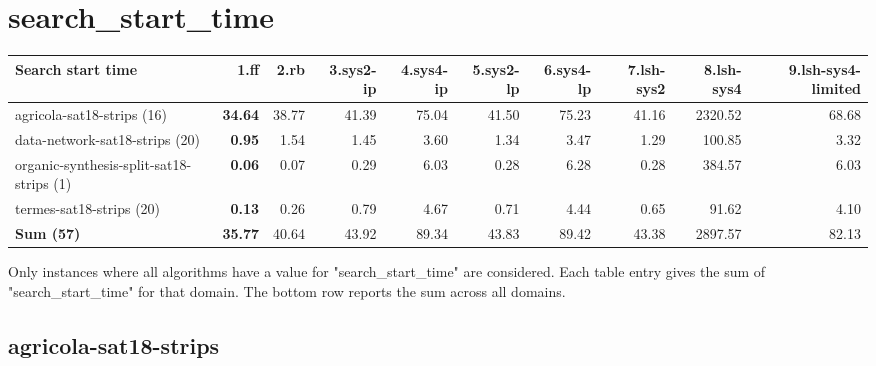 \documentclass{article}
\newcommand{\numtasks}[1]{\small{(#1)}}
\begin{document}
\hypertarget{search_start_time}{}
\section*{search\_start\_time}

\begin{tabular}{@{}lrrrrrrrrr@{}}
Search start time & 1.ff & 2.rb & 3.sys2-ip & 4.sys4-ip & 5.sys2-lp & 6.sys4-lp & 7.lsh-sys2 & 8.lsh-sys4 & 9.lsh-sys4-limited \\
\midrule
agricola-sat18-strips \numtasks{16} & \textbf{34.64} & 38.77 & 41.39 & 75.04 & 41.50 & 75.23 & 41.16 & 2320.52 & 68.68 \\
data-network-sat18-strips \numtasks{20} & \textbf{0.95} & 1.54 & 1.45 & 3.60 & 1.34 & 3.47 & 1.29 & 100.85 & 3.32 \\
organic-synthesis-split-sat18-strips \numtasks{1} & \textbf{0.06} & 0.07 & 0.29 & 6.03 & 0.28 & 6.28 & 0.28 & 384.57 & 6.03 \\
termes-sat18-strips \numtasks{20} & \textbf{0.13} & 0.26 & 0.79 & 4.67 & 0.71 & 4.44 & 0.65 & 91.62 & 4.10 \\
\textbf{Sum \numtasks{57}} & \textbf{35.77} & 40.64 & 43.92 & 89.34 & 43.83 & 89.42 & 43.38 & 2897.57 & 82.13 \\
\end{tabular}

Only instances where all algorithms have a value for "search\_start\_time" are considered. Each table entry gives the sum of "search\_start\_time" for that domain. The bottom row reports the sum across all domains.

\hypertarget{search_start_time-agricola-sat18-strips}{}
\subsection*{agricola-sat18-strips}
\end{document}
